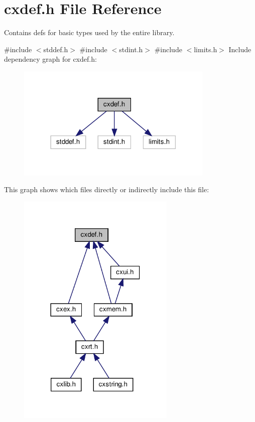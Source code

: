 \hypertarget{a00005}{}\section{cxdef.\+h File Reference}
\label{a00005}


Contains defs for basic types used by the entire library.  


{\ttfamily \#include $<$stddef.\+h$>$}\newline
{\ttfamily \#include $<$stdint.\+h$>$}\newline
{\ttfamily \#include $<$limits.\+h$>$}\newline
Include dependency graph for cxdef.\+h\+:
\nopagebreak
\begin{figure}[H]
\begin{center}
\leavevmode
\includegraphics[width=266pt]{a00006}
\end{center}
\end{figure}
This graph shows which files directly or indirectly include this file\+:
\nopagebreak
\begin{figure}[H]
\begin{center}
\leavevmode
\includegraphics[width=213pt]{a00007}
\end{center}
\end{figure}
